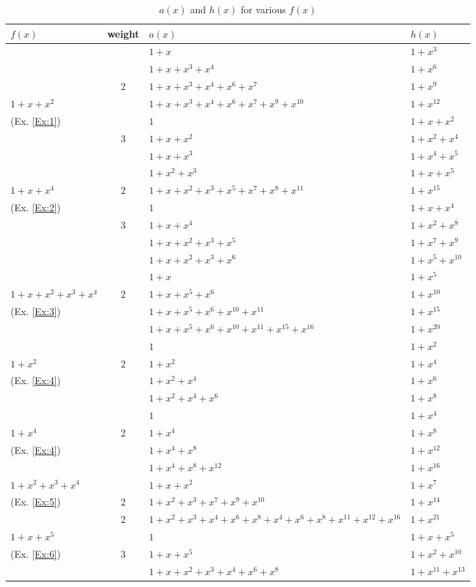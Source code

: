 \begin{table}[htbp]
\caption{$a(x)$ and $h(x)$ for various $f(x)$}
\centering
\begin{tabularx}{0.48\textwidth}{l|cXl} 
\toprule
$f(x)$ & weight & $a(x)$ & $h(x)$\\
\midrule
 &  & $1+x$ & $1+x^{3}$ \\
&  &$1+x+x^3+x^4$ & $1+x^{6}$  \\
& 2 &$1+x+x^3+x^4+x^6+x^{7}$ &  $1+x^{9}$ \\
$1+x+x^2$&& $1+x+x^3+x^4+x^6+x^{7}+x^9+x^{10}$&  $1+x^{12}$ \\
\cline{2-4}
(Ex. \ref{Ex:1})& &$1$ & $1+x+x^2$\\ 
& 3&$1+x+x^2$ &  $1+x^2+x^4$\\
& &$1+x+x^3$ & $1+x^4+x^5$\\
& &$1+x^2+x^3$ & $1+x+x^5$ \\
\cline{1-4}
$1+x+x^4$&2& $1 +x +x^2 +x^3+x^5+x^7+x^8+x^{11}$&  $1+x^{15}$ \\
\cline{2-4}
(Ex. \ref{Ex:2})& &$1$ & $1+x+x^4$\\ 
& 3&$1+x+x^4$ &  $1+x^2+x^8$\\
& &$1+x+x^2+x^3+x^5$ & $1+x^7+x^9$\\
& &$1+x+x^2+x^3+x^6$ & $1+x^5+x^{10}$ \\
\cline{1-4}
&&$1+x$ &$1+x^5$\\ 
$1+x+x^2+x^3+x^4$&2&$1+x+x^5+x^6$ &$1+x^{10}$  \\
(Ex. \ref{Ex:3})&&$1+x+x^5+x^6+x^{10}+x^{11}$ & $1+x^{15}$ \\
&&$1+x+x^5+x^6+x^{10}+x^{11}+x^{15}+x^{16}$ &$1+x^{20}$  \\
\cline{1-4}
&&$1$ & $1+x^2$\\ 
$1+x^2$&2&$1+x^2$ & $1+x^4$ \\
(Ex. \ref{Ex:4})&&$1+x^2+x^4$ & $1+x^6$\\
&&$1+x^2+x^4+x^6$ & $1+x^8$\\
\cline{1-4}
&&$1$ & $1+x^4$\\ 
$1+x^4$&2&$1+x^4$ & $1+x^8$ \\
(Ex. \ref{Ex:4})&&$1+x^4+x^8$ & $1+x^{12}$\\
&&$1+x^4+x^8+x^12$ & $1+x^{16}$\\
\cline{1-4}
$1+x^2+x^3+x^4$&&$1+x+x^2$& $1+x^{7}$ \\
(Ex. \ref{Ex:5})&2&$1+x^2+x^3+x^7+x^9+x^{10}$	& $1+x^{14}$ \\
\cline{1-4}
&2&$1+x^2+x^3+x^4+x^6+x^8+x^{4}+x^{6}+x^{8}+x^{11}+x^{12}+x^{16}$ &  $1+x^{21}$\\
\cline{2-4}
$1+x+x^5$&&$1$ & $1+x+x^{5}$\\ 
(Ex. \ref{Ex:6})&3&$1+x+x^5$ &  $1+x^2+x^{10}$\\
&&$1+x+x^2+x^3+x^4+x^{6}+x^{8}$ & $1+x^{11}+x^{13}$\\
\bottomrule
\end{tabularx}
\label{examples-table}
\end{table}






